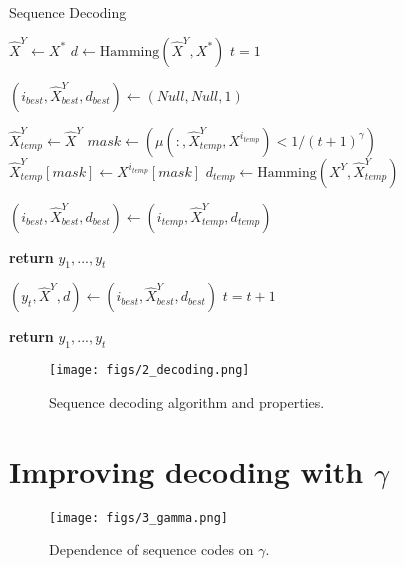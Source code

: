 \documentclass{article}
\begin{document}
\begin{algorithm}
\caption{Sequence Decoding}

\begin{algorithmic}[0]
\State $\hat{X}^Y \gets X^*$
\State $d \gets \textrm{Hamming}(\hat{X}^Y , X^*)$
\State $t = 1$


\State $(i_{best}, \hat{X}^Y_{best}, d_{best}) \gets (Null, Null, 1)$

    
        \State $\hat{X}^Y_{temp} \gets \hat{X}^Y $
        \State $ mask \gets (\mu(:, \hat{X}^Y_{temp}, X^{i_{temp}}) < 1/(t+1)^\gamma)$
        \State $\hat{X}^Y_{temp}[mask] \gets X^{i_{temp}}[mask]$
        \State $d_{temp} \gets \textrm{Hamming}(X^Y, \hat{X}^Y_{temp})$
        
            
            \State $(i_{best}, \hat{X}^Y_{best}, d_{best}) \gets (i_{temp}, \hat{X}^Y_{temp}, d_{temp})$
            
        \EndIf
    \EndFor
    
    
        \State \textbf{return} $y_1, ..., y_t$
        
    \Else
    
        \State $(y_t, \hat{X}^Y, d) \gets (i_{best}, \hat{X}^Y_{best}, d_{best})$
        \State $t = t+1$
        
    \EndIf

\EndWhile

\State \textbf{return} $y_1, ..., y_t$
\EndFunction

\end{algorithmic}
\end{algorithm}

\begin{figure}[!t]
    \centering
    \texttt{[image: figs/2\_decoding.png]}
    \caption{Sequence decoding algorithm and properties.}
 \end{figure}

\section{Improving decoding with $\gamma$}

\begin{figure}[!t]
    \centering
    \texttt{[image: figs/3\_gamma.png]}
    \caption{Dependence of sequence codes on $\gamma$.}
 \end{figure}
\end{document}
